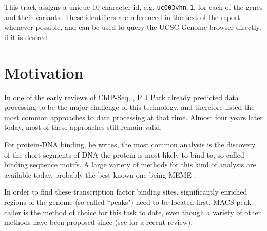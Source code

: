 \documentclass[parskip]{cs4rep}
\newcommand{\gene}[1]{{\tt #1}}
\begin{document}
This track assigns a unique 10-character id, e.g. \gene{uc003vhn.1}, for each of the genes and their variants. These identifiers are referenced in the text of the report whenever possible, and can be used to query the UCSC Genome browser \cite{Kent:2002wd} directly, if it is desired.

\chapter{Motivation}
\label{cha:motivation}

In one of the early reviews of ChIP-Seq, \cite{Park:2009wc}, P J Park already predicted data processing to be the major challenge of this technology, and therefore listed the most common approaches to data processing at that time. Almost four years later today, most of these approaches still remain valid.

For protein-DNA binding, he writes, the most common analysis is the discovery of the short segments of DNA the protein is most likely to bind to, so called binding sequence motifs. A large variety of methods for this kind of analysis are available today, probably the best-known one being MEME \cite{Grundy:1997vb}.

In order to find these transcription factor binding sites, significantly enriched regions of the genome (so called ``peaks") need to be located first. MACS peak caller \cite{Zhang:2008wp} is the method of choice for this task to date, even though a variety of other methods have been proposed since (see \cite{Furey:2012ha} for a recent review).
\end{document}
